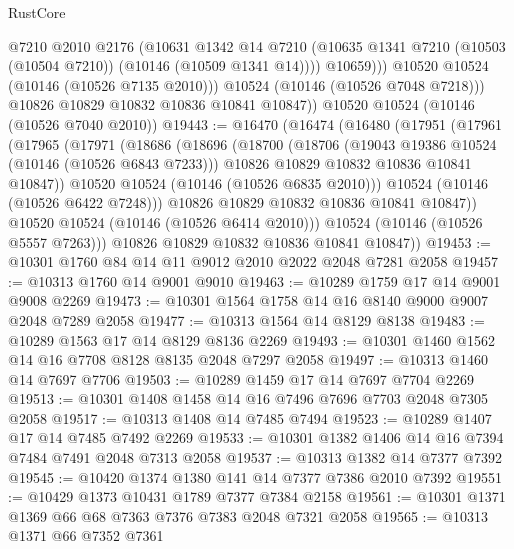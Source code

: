 \begin{lexlean}{RustCore}
\begin{coremodule}
                  @7210
                  @2010
                  @2176
                  (@10631
                    @1342
                    @14
                    @7210
                    (@10635 @1341 @7210 (@10503 (@10504 @7210)) (@10146 (@10509 @1341 @14))))
                  @10659)))
            @10520
            @10524
            (@10146 (@10526 @7135 @2010)))
          @10524
          (@10146 (@10526 @7048 @7218)))
        @10826
        @10829
        @10832
        @10836
        @10841
        @10847))
    @10520
    @10524
    (@10146 (@10526 @7040 @2010))
@19443 := @16470
    (@16474
      (@16480
        (@17951
          (@17961
            (@17965
              (@17971
                (@18686
                  (@18696
                    (@18700
                      (@18706
                        (@19043 @19386 @10524 (@10146 (@10526 @6843 @7233)))
                        @10826
                        @10829
                        @10832
                        @10836
                        @10841
                        @10847))
                    @10520
                    @10524
                    (@10146 (@10526 @6835 @2010)))
                  @10524
                  (@10146 (@10526 @6422 @7248)))
                @10826
                @10829
                @10832
                @10836
                @10841
                @10847))
            @10520
            @10524
            (@10146 (@10526 @6414 @2010)))
          @10524
          (@10146 (@10526 @5557 @7263)))
        @10826
        @10829
        @10832
        @10836
        @10841
        @10847))
@19453 := @10301 @1760 @84 @14 @11 @9012 @2010 @2022 @2048 @7281 @2058
@19457 := @10313 @1760 @14 @9001 @9010
@19463 := @10289 @1759 @17 @14 @9001 @9008 @2269
@19473 := @10301 @1564 @1758 @14 @16 @8140 @9000 @9007 @2048 @7289 @2058
@19477 := @10313 @1564 @14 @8129 @8138
@19483 := @10289 @1563 @17 @14 @8129 @8136 @2269
@19493 := @10301 @1460 @1562 @14 @16 @7708 @8128 @8135 @2048 @7297 @2058
@19497 := @10313 @1460 @14 @7697 @7706
@19503 := @10289 @1459 @17 @14 @7697 @7704 @2269
@19513 := @10301 @1408 @1458 @14 @16 @7496 @7696 @7703 @2048 @7305 @2058
@19517 := @10313 @1408 @14 @7485 @7494
@19523 := @10289 @1407 @17 @14 @7485 @7492 @2269
@19533 := @10301 @1382 @1406 @14 @16 @7394 @7484 @7491 @2048 @7313 @2058
@19537 := @10313 @1382 @14 @7377 @7392
@19545 := @10420 @1374 @1380 @141 @14 @7377 @7386 @2010 @7392
@19551 := @10429 @1373 @10431 @1789 @7377 @7384 @2158
@19561 := @10301 @1371 @1369 @66 @68 @7363 @7376 @7383 @2048 @7321 @2058
@19565 := @10313 @1371 @66 @7352 @7361

\end{coremodule}
\end{lexlean}
